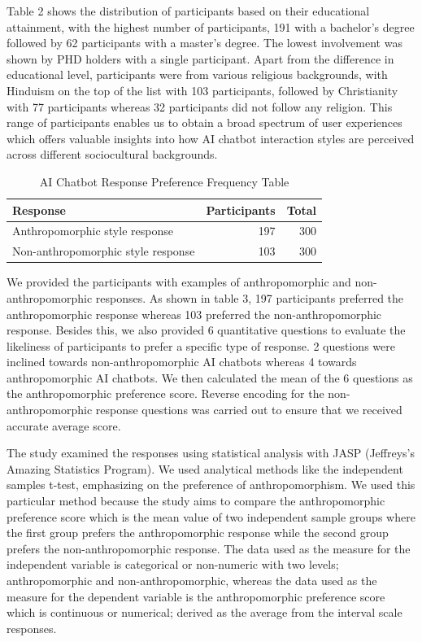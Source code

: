 \documentclass[conference]{IEEEtran}
\begin{document}
Table 2 shows the distribution of participants based on their educational attainment, with the highest number of participants, 191 with a bachelor’s degree followed by 62 participants with a master’s degree. The lowest involvement was shown by PHD holders with a single participant. Apart from the difference in educational level, participants were from various religious backgrounds, with Hinduism on the top of the list with 103 participants, followed by Christianity with 77 participants whereas 32 participants did not follow any religion. This range of participants enables us to obtain a broad spectrum of user experiences which offers valuable insights into how AI chatbot interaction styles are perceived across different sociocultural backgrounds.

\begin{table}[ht]
    \centering
    \caption{AI Chatbot Response Preference Frequency Table}
    \label{tab:anthropomorphicTest}
    \begin{tabular}{lrr}
        \toprule
        \textbf{Response} & \textbf{Participants} & \textbf{Total} \\
        \midrule
        Anthropomorphic style response & 197 & 300 \\
		Non-anthropomorphic style response & 103 & 300 \\
        \bottomrule
    \end{tabular}
\end{table}

We provided the participants with examples of anthropomorphic and non-anthropomorphic responses. As shown in table 3, 197 participants preferred the anthropomorphic response whereas 103 preferred the non-anthropomorphic response. Besides this, we also provided 6 quantitative questions to evaluate the likeliness of participants to prefer a specific type of response. 2 questions were inclined towards non-anthropomorphic AI chatbots whereas 4 towards anthropomorphic AI chatbots. We then calculated the mean of the 6 questions as the anthropomorphic preference score. Reverse encoding for the non-anthropomorphic response questions was carried out to ensure that we received accurate average score. \par
The study examined the responses using statistical analysis with JASP (Jeffreys's Amazing Statistics Program). We used analytical methods like the independent samples t-test, emphasizing on the preference of anthropomorphism. We used this particular method because the study aims to compare the anthropomorphic preference score which is the mean value of two independent sample groups where the first group prefers the anthropomorphic response while the second group prefers the non-anthropomorphic response. The data used as the measure for the independent variable is categorical or non-numeric with two levels; anthropomorphic and non-anthropomorphic, whereas the data used as the measure for the dependent variable is the anthropomorphic preference score which is continuous or numerical; derived as the average from the interval scale responses. \\
\end{document}
